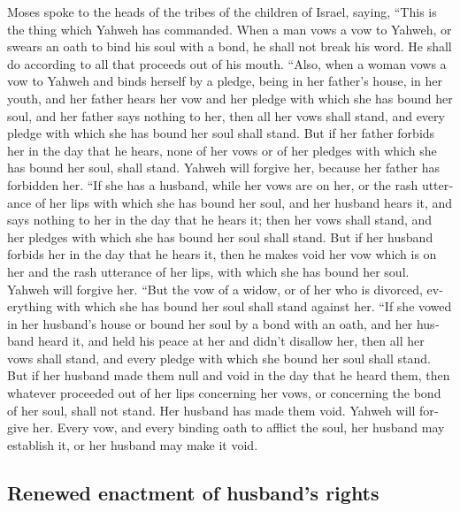 \begin{paracol}{2}
\begin{otherlanguage}{english}
 Moses spoke to the heads of the tribes of the children of
Israel, saying, ``This is the thing which Yahweh has commanded.
 When a man vows a vow to Yahweh, or swears an oath to
bind his soul with a bond, he shall not break his word. He shall do
according to all that proceeds out of his mouth.  ``Also,
when a woman vows a vow to Yahweh and binds herself by a pledge, being
in her father's house, in her youth,  and her father hears
her vow and her pledge with which she has bound her soul, and her father
says nothing to her, then all her vows shall stand, and every pledge
with which she has bound her soul shall stand.  But if her
father forbids her in the day that he hears, none of her vows or of her
pledges with which she has bound her soul, shall stand. Yahweh will
forgive her, because her father has forbidden her.  ``If
she has a husband, while her vows are on her, or the rash utterance of
her lips with which she has bound her soul,  and her
husband hears it, and says nothing to her in the day that he hears it;
then her vows shall stand, and her pledges with which she has bound her
soul shall stand.  But if her husband forbids her in the
day that he hears it, then he makes void her vow which is on her and the
rash utterance of her lips, with which she has bound her soul. Yahweh
will forgive her.  ``But the vow of a widow, or of her who
is divorced, everything with which she has bound her soul shall stand
against her.  ``If she vowed in her husband's house or
bound her soul by a bond with an oath,  and her husband
heard it, and held his peace at her and didn't disallow her, then all
her vows shall stand, and every pledge with which she bound her soul
shall stand.  But if her husband made them null and void
in the day that he heard them, then whatever proceeded out of her lips
concerning her vows, or concerning the bond of her soul, shall not
stand. Her husband has made them void. Yahweh will forgive her.
 Every vow, and every binding oath to afflict the soul,
her husband may establish it, or her husband may make it void.

\hypertarget{renewed-enactment-of-husbands-rights}{%
\subsection{Renewed enactment of husband's
rights}\label{renewed-enactment-of-husbands-rights}}


\end{otherlanguage}
\end{paracol}
